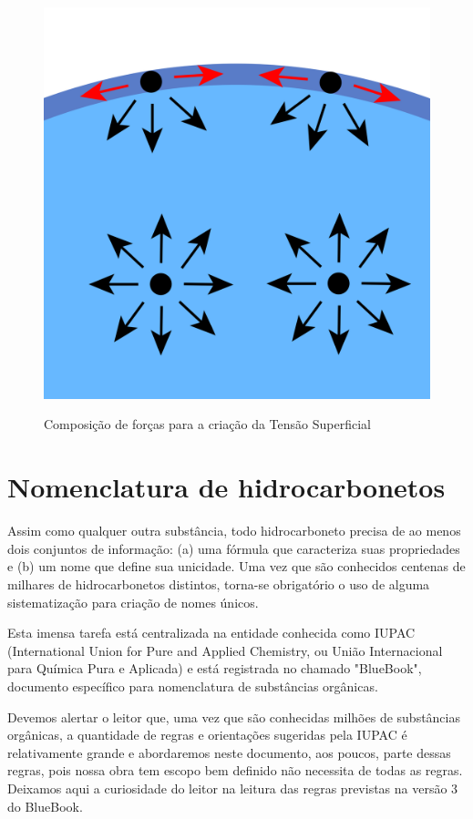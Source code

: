 \documentclass[a4paper,12pt]{book}
\begin{document}
\begin{figure}[h]
	\centering
	\caption{Composição de forças para a criação da Tensão Superficial}
	\vspace{0.5cm}
	\includegraphics[width=1\linewidth]{imagens/ts.png}
\label{fig:ts}
\end{figure}

\section{Nomenclatura de hidrocarbonetos}
Assim como qualquer outra substância, todo hidrocarboneto precisa de ao menos dois conjuntos de informação: (a) uma fórmula que caracteriza suas propriedades e (b) um nome que define sua unicidade. Uma vez que são conhecidos centenas de milhares de hidrocarbonetos distintos, torna-se obrigatório o uso de alguma sistematização para criação de nomes únicos.

Esta imensa tarefa está centralizada na entidade conhecida como IUPAC (International Union for Pure and Applied Chemistry, ou União Internacional para Química Pura e Aplicada) e está registrada no chamado "BlueBook", documento específico para nomenclatura de substâncias orgânicas.

Devemos alertar o leitor que, uma vez que são conhecidas milhões de substâncias orgânicas, a quantidade de regras e orientações sugeridas pela IUPAC é relativamente grande e abordaremos neste documento, aos poucos, parte dessas regras, pois nossa obra tem escopo bem definido não necessita de todas as regras. Deixamos aqui a curiosidade do leitor na leitura das regras previstas na versão 3 do BlueBook.
\end{document}
